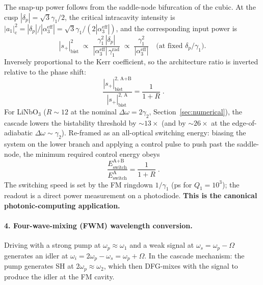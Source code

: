 \documentclass[11pt,a4paper]{article}
\newcommand{\Dom}{\Delta\omega}
\begin{document}
The snap-up power follows from the saddle-node bifurcation of the
cubic.  At the cusp $|\delta_p|=\sqrt{3}\gamma_1/2$, the critical
intracavity intensity is $|a_1|^{2}_\text{c}=|\delta_p|/|\alpha_3^\text{eff}|
=\sqrt{3}\gamma_1/(2|\alpha_3^\text{eff}|)$, and the corresponding
input power is
\begin{equation}
  |s_+|^{2}_\text{bist}\;\propto\;
     \frac{\gamma_1^{2}\,|\delta_p|}{|\alpha_3^\text{eff}|\,\gamma_1^\text{rad}}
     \;\propto\;\frac{\gamma_1^{2}}{|\alpha_3^\text{eff}|}
     \quad\text{(at fixed }\delta_p/\gamma_1\text{).}
  \label{eq:bist-threshold}
\end{equation}
Inversely proportional to the Kerr coefficient, so the architecture
ratio is inverted relative to the phase shift:
\begin{equation}
  \boxed{\;\frac{|s_+|^{2,\,\text{A+B}}_\text{bist}}{|s_+|^{2,\,\text{A}}_\text{bist}}=\frac{1}{1+R}\;.}
  \label{eq:bist-ratio}
\end{equation}
For LiNbO$_3$ ($R\sim 12$ at the nominal $\Dom=2\gamma_2$,
Section~\ref{sec:numerical}), the cascade lowers the bistability
threshold by $\sim\!13\times$ (and by $\sim\!26\times$ at the
edge-of-adiabatic $\Dom\sim\gamma_2$).  Re-framed as an all-optical
switching energy: biasing the system on the lower branch and applying
a control pulse to push past the saddle-node, the minimum required
control energy obeys
\begin{equation}
  \boxed{\;\frac{E_\text{switch}^{\text{A+B}}}{E_\text{switch}^{\text{A}}}=\frac{1}{1+R}\;.}
\end{equation}
The switching speed is set by the FM ringdown $1/\gamma_1$ (ps for
$Q_1=10^{3}$); the readout is a direct power measurement on a
photodiode.  \textbf{This is the canonical photonic-computing
application.}

\paragraph{4. Four-wave-mixing (FWM) wavelength conversion.}
Driving with a strong pump at $\omega_p\approx\omega_1$ and a weak
signal at $\omega_s=\omega_p-\Omega$ generates an idler at
$\omega_i=2\omega_p-\omega_s=\omega_p+\Omega$.  In the cascade
mechanism: the pump generates SH at $2\omega_p\approx\omega_2$, which
then DFG-mixes with the signal to produce the idler at the FM cavity.
\end{document}
